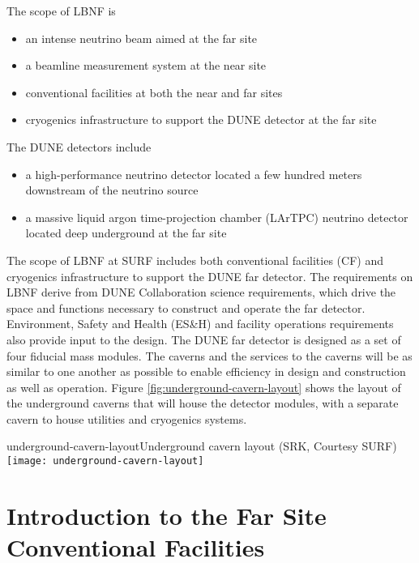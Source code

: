 The scope of LBNF is
\begin{itemize}
\item an intense neutrino beam aimed at the far site
\item a beamline measurement system at the near site 
\item conventional facilities at both the near and far sites
\item cryogenics infrastructure to support the DUNE detector at the far site
\end{itemize}

The DUNE detectors include
\begin{itemize}
\item a high-performance neutrino detector located a few hundred meters downstream of the neutrino source
\item a massive liquid argon time-projection chamber (LArTPC) neutrino detector located deep underground at the far site
\end{itemize}

The scope of LBNF at SURF includes both conventional facilities (CF) and cryogenics infrastructure to support the DUNE far detector. The requirements on LBNF derive from DUNE Collaboration science requirements\cite{dune-sci-req}, which drive the space and functions necessary to construct and operate the far detector. Environment, Safety and Health (ES\&H) and facility operations requirements also provide input to the design. The DUNE far detector is designed as a set of four  fiducial mass modules. The caverns and the services to the caverns will be as similar to one another as possible to enable efficiency in design and construction as well as operation. Figure \ref{fig:underground-cavern-layout} shows the layout of the underground caverns that will house the detector modules, with a separate cavern to house utilities and cryogenics systems. 

\begin{cdrfigure}{underground-cavern-layout}{Underground cavern layout (SRK, Courtesy SURF)}
\texttt{[image: underground-cavern-layout]}
\end{cdrfigure}


\section{Introduction to the Far Site Conventional Facilities}
\label{sec:fs-facil-cf}

